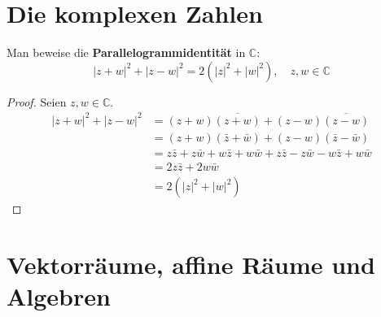 \section{Die komplexen Zahlen}
\setcounter{aufgabe}{10}
\begin{aufgabe}
	Man beweise die \textbf{Parallelogrammidentität} in $\mathbb C$:
	\[
		|z + w|^2 + |z - w|^2 = 2( |z|^2 + |w|^2), \quad z, w \in \mathbb C
	\]
\end{aufgabe}
\begin{proof}
	Seien $z, w \in \mathbb C$.
	\begin{align*}
		|z + w|^2 + |z - w|^2
			&= (z+w) \overline{(z + w)} + (z-w) \overline{ (z-w) } \\
			&= (z + w) (\bar z + \bar w) + (z - w) (\bar z - \bar w) \\
			&= z \bar z + z \bar w + w \bar z + w \bar w + z \bar z - z \bar w - w \bar z + w \bar w \\
			&= 2 z \bar z + 2 w \bar w \\
			&= 2 \left( |z|^2 + |w|^2 \right)
	\end{align*}
\end{proof}

\section{Vektorräume, affine Räume und Algebren}
